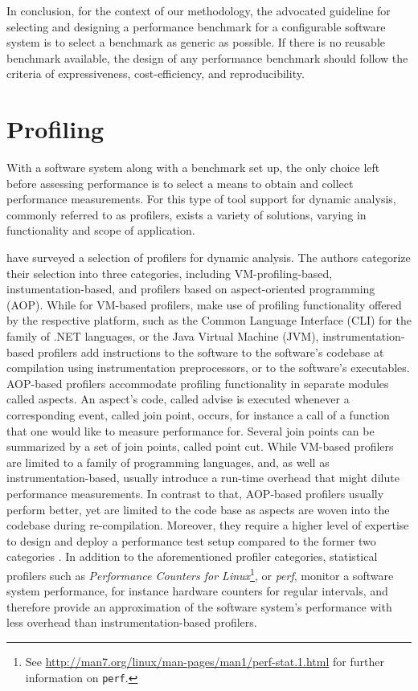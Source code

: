 In conclusion, for the context of our methodology, the advocated guideline for
selecting and designing a performance benchmark for a configurable software
system is to select a benchmark as generic as possible. If there is no reusable
benchmark available, the design of any performance benchmark should follow the
criteria of expressiveness, cost-efficiency, and reproducibility.

\section{Profiling}
With a software system along with a benchmark set up, the only choice left
before assessing performance is to select a means to obtain and collect
performance measurements. For this type of tool support for dynamic analysis,
commonly referred to as profilers, exists a variety of solutions, varying in
functionality and scope of application.

\cite{satapathy_survey_2015} have surveyed a selection of profilers for dynamic
analysis. The authors categorize their selection into three categories,
including VM-profiling-based, instumentation-based, and profilers based on
aspect-oriented programming (AOP). While for VM-based profilers, make use of
profiling functionality offered by the respective platform, such as the Common
Language Interface (CLI) for the family of .NET languages,  or the Java Virtual
Machine (JVM), instrumentation-based profilers add instructions to the software
to the software’s codebase at compilation using instrumentation preprocessors,
or to the software’s executables. AOP-based profilers accommodate profiling
functionality in separate modules called aspects. An aspect’s code, called
advise is executed whenever a corresponding event, called join point,  occurs,
for instance a call of a function that one would like to measure performance
for. Several join points can be summarized by a set of join points, called
point cut. While VM-based profilers are limited to a family of programming
languages, and, as well as instrumentation-based, usually introduce a run-time
overhead that might dilute performance measurements. In contrast to that,
AOP-based profilers  usually perform better, yet are limited to the code base as aspects
are woven into the codebase during re-compilation. Moreover, they require a
higher level of expertise to design and deploy a performance test setup
compared to the former two categories \citep{satapathy_survey_2015}. In addition
to the aforementioned profiler categories, statistical profilers such as
\emph{Performance Counters for
Linux}\footnote{See
\url{http://man7.org/linux/man-pages/man1/perf-stat.1.html} for further
information on \texttt{perf}.}, or \emph{perf}, monitor a software system
performance, for instance hardware counters for regular intervals, and therefore provide an approximation of the software system’s performance with less overhead than instrumentation-based profilers.

